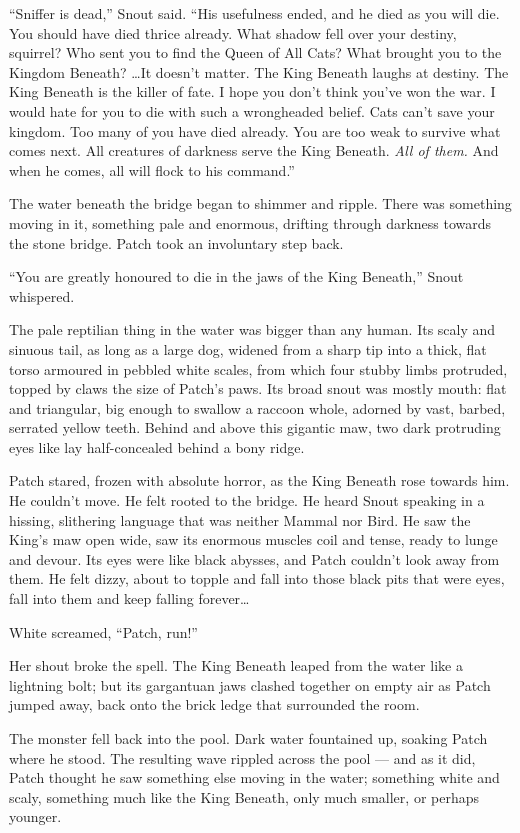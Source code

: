 \documentclass[ebook,oneside,openany,17pt]{memoir}
\begin{document}
“Sniffer is dead,” Snout said. “His usefulness ended, and he died as
you will die. You should have died thrice already. What shadow fell
over your destiny, squirrel? Who sent you to find the Queen of All
Cats? What brought you to the Kingdom Beneath? …It doesn’t matter. The
King Beneath laughs at destiny. The King Beneath is the killer of
fate. I hope you don’t think you’ve won the war. I would hate for you
to die with such a wrongheaded belief. Cats can’t save your
kingdom. Too many of you have died already. You are too weak to
survive what comes next. All creatures of darkness serve the King
Beneath. \emph{All of them.} And when he comes, all will flock to
his command.”

The water beneath the bridge began to shimmer and ripple. There was
something moving in it, something pale and enormous, drifting through
darkness towards the stone bridge. Patch took an involuntary step
back.

“You are greatly honoured to die in the jaws of the King Beneath,”
Snout whispered.

The pale reptilian thing in the water was bigger than any human. Its
scaly and sinuous tail, as long as a large dog, widened from a sharp
tip into a thick, flat torso armoured in pebbled white scales, from
which four stubby limbs protruded, topped by claws the size of Patch’s
paws. Its broad snout was mostly mouth: flat and triangular, big
enough to swallow a raccoon whole, adorned by vast, barbed, serrated
yellow teeth. Behind and above this gigantic maw, two dark protruding
eyes like lay half-concealed behind a bony ridge.

Patch stared, frozen with absolute horror, as the King Beneath rose
towards him. He couldn’t move. He felt rooted to the bridge. He heard
Snout speaking in a hissing, slithering language that was neither
Mammal nor Bird. He saw the King’s maw open wide, saw its enormous
muscles coil and tense, ready to lunge and devour. Its eyes were like
black abysses, and Patch couldn’t look away from them. He felt dizzy,
about to topple and fall into those black pits that were eyes, fall
into them and keep falling forever…

White screamed, “Patch, run!”

Her shout broke the spell. The King Beneath leaped from the water like
a lightning bolt; but its gargantuan jaws clashed together on empty
air as Patch jumped away, back onto the brick ledge that surrounded
the room.

The monster fell back into the pool. Dark water fountained up, soaking
Patch where he stood. The resulting wave rippled across the pool — and
as it did, Patch thought he saw something else moving in the water;
something white and scaly, something much like the King Beneath, only
much smaller, or perhaps younger.
\end{document}
